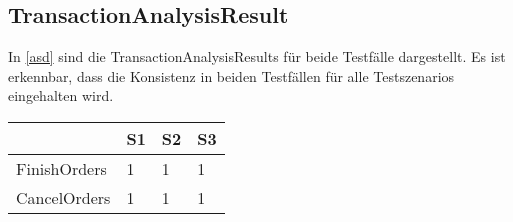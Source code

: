 \subsection{TransactionAnalysisResult}
In \cref{asd} sind die TransactionAnalysisResults für beide Testfälle dargestellt. Es ist erkennbar, dass die Konsistenz in beiden Testfällen für alle Testszenarios eingehalten wird. 

\begin{center}
	\fontsize{9}{12}\selectfont
	\begin{longtable}[h]{|p{2cm}|p{1cm}|p{1cm}|p{1cm}|}
		\hline
		 & S1 & S2 & S3 \\ \hline
		\endhead
		\endfoot
		FinishOrders & 1 & 1 & 1 \\ \hline	
		CancelOrders & 1 & 1 & 1 \\ \hline
	\end{longtable}
\end{center}
\FloatBarrier